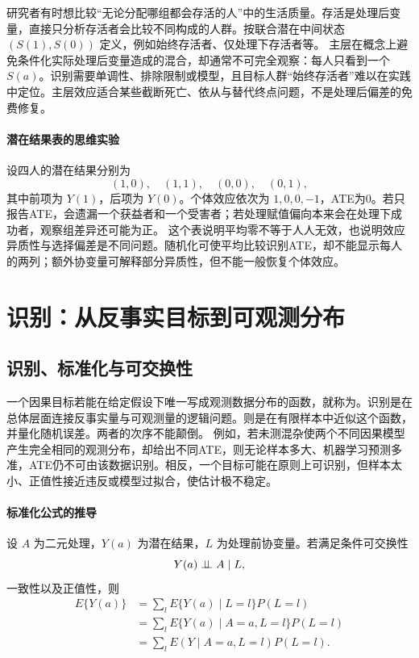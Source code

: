 研究者有时想比较“无论分配哪组都会存活的人”中的生活质量。存活是处理后变量，直接只分析存活者会比较不同构成的人群。按联合潜在中间状态 $(S(1),S(0))$ 定义，例如始终存活者、仅处理下存活者等。
主层在概念上避免条件化实际处理后变量造成的混合，却通常不可完全观察：每人只看到一个 $S(a)$。识别需要单调性、排除限制或模型，且目标人群“始终存活者”难以在实践中定位。主层效应适合某些截断死亡、依从与替代终点问题，不是处理后偏差的免费修复\parencite{frangakisrubin2002}。

\paragraph{潜在结果表的思维实验}

设四人的潜在结果分别为
\[
(1,0),\quad (1,1),\quad (0,0),\quad (0,1),
\]
其中前项为 $Y(1)$，后项为 $Y(0)$。个体效应依次为 $1,0,0,-1$，ATE为0。若只报告ATE，会遗漏一个获益者和一个受害者；若处理赋值偏向本来会在处理下成功者，观察组差异还可能为正。
这个表说明平均零不等于人人无效，也说明效应异质性与选择偏差是不同问题。随机化可使平均比较识别ATE，却不能显示每人的两列；额外协变量可解释部分异质性，但不能一般恢复个体效应。

\section{识别：从反事实目标到可观测分布}

\subsection{识别、标准化与可交换性}

一个因果目标若能在给定假设下唯一写成观测数据分布的函数，就称为。识别是在总体层面连接反事实量与可观测量的逻辑问题。则是在有限样本中近似这个函数，并量化随机误差。两者的次序不能颠倒。
例如，若未测混杂使两个不同因果模型产生完全相同的观测分布，却给出不同ATE，则无论样本多大、机器学习预测多准，ATE仍不可由该数据识别。相反，一个目标可能在原则上可识别，但样本太小、正值性接近违反或模型过拟合，使估计极不稳定。

\paragraph{标准化公式的推导}

设 $A$ 为二元处理，$Y(a)$ 为潜在结果，$L$ 为处理前协变量。若满足条件可交换性
\[
Y(a)\mathrel{\perp\!\!\!\perp} A\mid L,
\]
一致性以及正值性，则
\begin{align*}
E\{Y(a)\}
&=\sum_l E\{Y(a)\mid L=l\}P(L=l)\\
&=\sum_l E\{Y(a)\mid A=a,L=l\}P(L=l)\\
&=\sum_l E(Y\mid A=a,L=l)P(L=l).
\end{align*}

